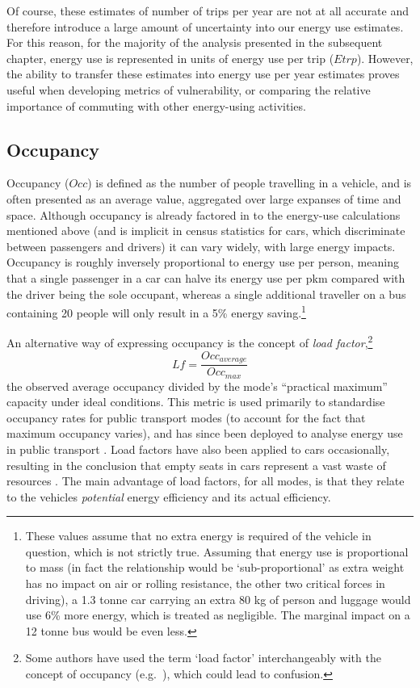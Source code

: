 Of course, these estimates of number of trips per year are not at all
accurate and therefore introduce a large amount of uncertainty into our
energy use estimates. For this reason, for the majority of the analysis
presented in the subsequent chapter, energy use is represented in units of
energy use per trip ($Etrp$). However, the ability to transfer these
estimates into energy use per year estimates proves useful when developing
metrics of vulnerability, or comparing the relative importance of
commuting with other energy-using activities. 

\subsection{Occupancy}
Occupancy ($Occ$) is defined as the number of people travelling in a vehicle, and
is often presented as an average value, aggregated over large expanses of time
and space. Although occupancy is already factored in to the energy-use
calculations mentioned above (and is implicit in census statistics for cars,
which discriminate between passengers and drivers) it can vary widely, with
large energy impacts.
Occupancy is roughly inversely proportional to energy use per person,
meaning that a single passenger in a car can halve its energy use per pkm
compared with the driver being the sole occupant, whereas a single additional
traveller on a bus containing 20 people will only result in a 5\% energy
saving.\footnote{These values
assume that no extra energy is required of the vehicle in question,
which is not strictly true. Assuming that energy use is proportional to
mass (in fact the relationship would be `sub-proportional' as extra weight
has no impact on air or rolling resistance, the other two critical forces
in driving), a 1.3 tonne car carrying an extra 80 kg of person and luggage would
use 6\% more energy, which is treated as negligible. The marginal
impact on a 12 tonne bus would be even less.
}

An alternative way of expressing occupancy is the concept of
\emph{load factor},\footnote{Some
authors have used the term `load factor' interchangeably with the concept
of occupancy (e.g.~\citealp{Jennings2013}), which could lead to confusion.}
\begin{equation}
 Lf = \frac{Occ_{average}}{Occ_{max}}
\end{equation}
the observed average occupancy divided by the mode's ``practical maximum''
\citep[p.~562]{Jackson1975} capacity under ideal conditions.
This metric is used primarily to standardise occupancy rates for public
transport modes (to account for the fact that maximum occupancy varies),
and has since been deployed to analyse energy use in public transport
\citep{Pisarski1975, Schafer1999}. Load factors have also been applied to
cars occasionally, resulting in the conclusion that empty seats
in cars represent a vast waste of resources \citep{Jackson1975}.
The main advantage of load factors, for all modes, is that they relate to the
vehicles \emph{potential} energy efficiency and its actual efficiency.

